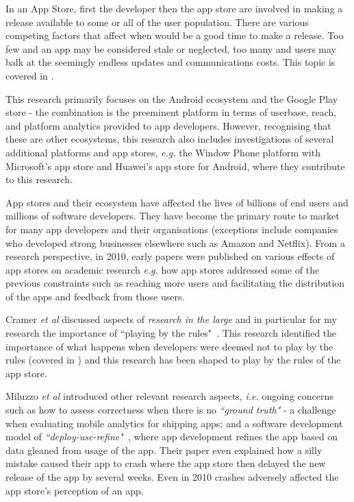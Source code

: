 In an App Store, first the developer then the app store are involved in making a release available to some or all of the user population. There are various competing factors that affect when would be a good time to make a release. Too few and an app may be considered stale or neglected, too many and users may balk at the seemingly endless updates and communications costs. This topic is covered in .  

This research primarily focuses on the Android ecosystem and the Google Play store - the combination is the preeminent platform in terms of userbase, reach, and platform analytics provided to app developers. However, recognising that these are other ecosystems, this research also includes investigations of several additional platforms and app stores, \emph{e.g.} the Window Phone platform with Microsoft's app store and Huawei's app store for Android, where they contribute to this research. 

App stores and their ecosystem have affected the lives of billions of end users and millions of software developers. They have become the primary route to market for many app developers and their organisations (exceptions include companies who developed strong businesses elsewhere such as Amazon and Netflix). 
From a research perspective, in 2010, early papers were published on various effects of app stores on academic research \emph{e.g.} how app stores addressed some of the previous constraints such as reaching more users and facilitating the distribution of the apps and feedback from those users. 

Cramer \emph{et al} discussed aspects of \emph{research in the large} and in particular for my research the importance of ``playing by the rules"~. This research identified the importance of what happens when developers were deemed not to play by the rules (covered in ) and this research has been shaped to play by the rules of the app store. %

Miluzzo \emph{et al} introduced other relevant research aspects, \emph{i.e.}  ongoing concerns such as how to assess correctness when there is no \emph{``ground truth"} - a challenge when evaluating mobile analytics for shipping apps; and a software development model of \emph{``deploy-use-refine"}~, where app development refines the app based on data gleaned from usage of the app. Their paper even explained how a silly mistake caused their app to crash where the app store then delayed the new release of the app by several weeks. Even in 2010 crashes adversely affected the app store's perception of an app. %


